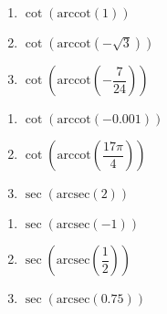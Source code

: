 \begin{multicols}{3}

\begin{enumerate}

\setcounter{enumi}{\value{HW}}

\item $\cot\left(\text{arccot}\left(1\right)\right)$ 
\item $\cot\left(\text{arccot}\left(-\sqrt{3}\right)\right)$ 
\item $\cot\left(\text{arccot}\left(-\dfrac{7}{24}\right)\right)$

\setcounter{HW}{\value{enumi}}

\end{enumerate}

\end{multicols}

\begin{multicols}{3}

\begin{enumerate}

\setcounter{enumi}{\value{HW}}

\item $\cot\left(\text{arccot}\left(-0.001\right)\right)$ 
\item $\cot\left(\text{arccot}\left( \dfrac{17\pi}{4} \right)\right)$
\item $\sec\left(\text{arcsec}\left(2\right)\right)$ 

\setcounter{HW}{\value{enumi}}

\end{enumerate}

\end{multicols}

\begin{multicols}{3}

\begin{enumerate}

\setcounter{enumi}{\value{HW}}

\item $\sec\left(\text{arcsec}\left(-1\right)\right)$ 
\item $\sec\left(\text{arcsec}\left(\dfrac{1}{2}\right)\right)$
\item $\sec\left(\text{arcsec}\left(0.75\right)\right)$ 

\setcounter{HW}{\value{enumi}}

\end{enumerate}

\end{multicols}

